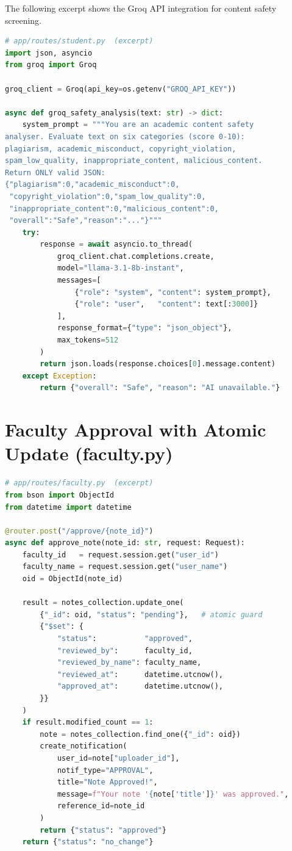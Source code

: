 \documentclass{sgcproject}
\begin{document}
\begin{appendices}
The following excerpt shows the Groq API integration for content safety screening.

\begin{lstlisting}[language=Python]
# app/routes/student.py  (excerpt)
import json, asyncio
from groq import Groq

groq_client = Groq(api_key=os.getenv("GROQ_API_KEY"))

async def groq_safety_analysis(text: str) -> dict:
    system_prompt = """You are an academic content safety
analyser. Evaluate text on six categories (score 0-10):
plagiarism, academic_misconduct, copyright_violation,
spam_low_quality, inappropriate_content, malicious_content.
Return ONLY valid JSON:
{"plagiarism":0,"academic_misconduct":0,
 "copyright_violation":0,"spam_low_quality":0,
 "inappropriate_content":0,"malicious_content":0,
 "overall":"Safe","reason":"..."}"""
    try:
        response = await asyncio.to_thread(
            groq_client.chat.completions.create,
            model="llama-3.1-8b-instant",
            messages=[
                {"role": "system", "content": system_prompt},
                {"role": "user",   "content": text[:3000]}
            ],
            response_format={"type": "json_object"},
            max_tokens=512
        )
        return json.loads(response.choices[0].message.content)
    except Exception:
        return {"overall": "Safe", "reason": "AI unavailable."}
\end{lstlisting}

\section{Faculty Approval with Atomic Update (faculty.py)}

\begin{lstlisting}[language=Python]
# app/routes/faculty.py  (excerpt)
from bson import ObjectId
from datetime import datetime

@router.post("/approve/{note_id}")
async def approve_note(note_id: str, request: Request):
    faculty_id   = request.session.get("user_id")
    faculty_name = request.session.get("user_name")
    oid = ObjectId(note_id)

    result = notes_collection.update_one(
        {"_id": oid, "status": "pending"},   # atomic guard
        {"$set": {
            "status":           "approved",
            "reviewed_by":      faculty_id,
            "reviewed_by_name": faculty_name,
            "reviewed_at":      datetime.utcnow(),
            "approved_at":      datetime.utcnow(),
        }}
    )
    if result.modified_count == 1:
        note = notes_collection.find_one({"_id": oid})
        create_notification(
            user_id=note["uploader_id"],
            notif_type="APPROVAL",
            title="Note Approved!",
            message=f"Your note '{note['title']}' was approved.",
            reference_id=note_id
        )
        return {"status": "approved"}
    return {"status": "no_change"}
\end{lstlisting}


\end{appendices}
\end{document}
